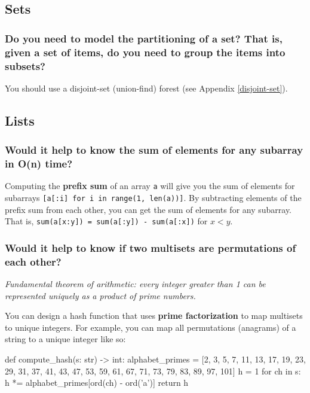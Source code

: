 \documentclass[12pt, titlepage]{article}
\begin{document}
\subsection{Sets}

\subsubsection{Do you need to model the partitioning of a set? That is, given a set of items, do you need to group the items into subsets?}

You should use a disjoint-set (union-find) forest (see Appendix \ref{disjoint-set}).

\subsection{Lists}

\subsubsection{Would it help to know the sum of elements for any subarray in O(n) time?}

Computing the \textbf{prefix sum} of an array \texttt{a} will give you the sum of elements for subarrays \texttt{[a[:i] for i in range(1, len(a))]}. By subtracting elements of the prefix sum from each other, you can get the sum of elements for any subarray. That is, \texttt{sum(a[x:y]) = sum(a[:y]) - sum(a[:x])} for $x < y$. \\

\subsubsection{Would it help to know if two multisets are permutations of each other?}

\textit{Fundamental theorem of arithmetic: every integer greater than 1 can be represented uniquely as a product of prime numbers.} \medskip

You can design a hash function that uses \textbf{prime factorization} to map multisets to unique integers. For example, you can map all permutations (anagrams) of a string to a unique integer like so: \medskip

\begin{python}
def compute_hash(s: str) -> int:
    alphabet_primes = [2, 3, 5, 7, 11, 13, 17, 19, 23, 29,
                       31, 37, 41, 43, 47, 53, 59, 61, 67,
                       71, 73, 79, 83, 89, 97, 101]
    h = 1
    for ch in s:
        h *= alphabet_primes[ord(ch) - ord('a')]
    return h
\end{python} \bigskip
\end{document}
